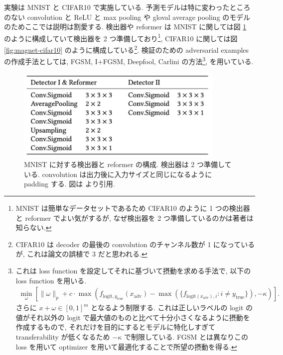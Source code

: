 実験は MNIST と CIFAR10 で実施している.
予測モデルは特に変わったところのない convolution と ReLU と max pooling や gloval average pooling のモデルのためここでは説明は割愛する.
検出器や reformer は MNIST に関しては図 \ref{fig:magnet-mnist} のように構成していて検出器を 2 つ準備しており\footnote{
MNIST は簡単なデータセットであるため CIFAR10 のように 1 つの検出器と reformer でよい気がするが, なぜ検出器を 2 つ準備しているのかは著者は知らない.
}, CIFAR10 に関しては図 \ref{fig:magnet-cifar10} のように構成している\footnote{
CIFAR10 は decoder の最後の convolution のチャンネル数が 1 になっているが, これは論文の誤植で 3 だと思われる.
}.
検証のための adversarial examples の作成手法としては, FGSM, I+FGSM, Deepfool, Carlini の方法\footnote{
これは loss function を設定してそれに基づいて摂動を求める手法で, 以下の loss function を用いる.
%
\begin{eqnarray}
\min_{\omega} \left[ \|\omega\|_p + c \cdot \max (f_{\text{logit}, y_{\text{true}}} (x_{\text{adv}}) - \max (\{ f_{\text{logit} (x_{\text{adv}}), i} : i \neq y_{\text{true}} \}), - \kappa) \right].
\label{eq:magnet-adv-cw}
\end{eqnarray}
%
さらに $x + \omega \in [0, 1]^m$ となるよう制限する.
これは正しいラベルの logit の値がそれ以外の logit で最大値のものと比べて十分小さくなるように摂動を作成するもので, それだけを目的にするとモデルに特化しすぎて transferability が低くなるため $- \kappa$ で制限している.
FGSM とは異なりこの loss を用いて optimizer を用いて最適化することで所望の摂動を得る.
}, \cite{carlini2017towards} を用いている.
%
\begin{figure}[htbp]
\begin{center}
\includegraphics[width=10.0cm]{figures/magnet-model-mnist.pdf}
\end{center}
\caption{
MNIST に対する検出器と reformer の構成.
検出器は 2 つ準備している.
convolution は出力後に入力サイズと同じになるように padding する.
図は \cite{meng2017magnet} より引用.
}
\label{fig:magnet-mnist}
\end{figure}
%
